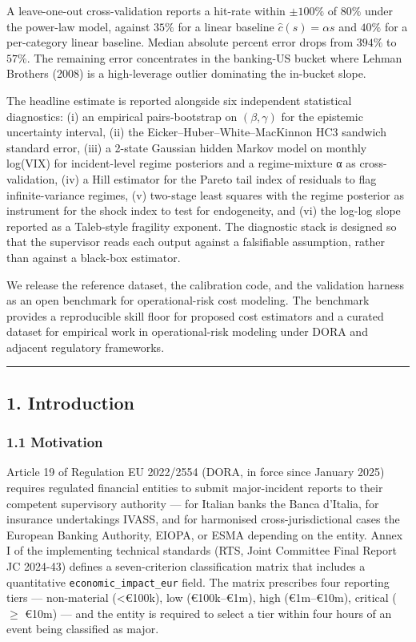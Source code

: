\documentclass[
]{article}
\begin{document}
A leave-one-out cross-validation reports a hit-rate within \(\pm 100\%\)
of \(80\%\) under the power-law model, against \(35\%\) for a linear
baseline \(\hat{c}(s) = \alpha s\) and \(40\%\) for a per-category
linear baseline. Median absolute percent error drops from \(394\%\) to
\(57\%\). The remaining error concentrates in the banking-US bucket
where Lehman Brothers (2008) is a high-leverage outlier dominating the
in-bucket slope.

The headline estimate is reported alongside six independent statistical
diagnostics: (i) an empirical pairs-bootstrap on \((\beta, \gamma)\) for
the epistemic uncertainty interval, (ii) the
Eicker--Huber--White--MacKinnon HC3 sandwich standard error, (iii) a
2-state Gaussian hidden Markov model on monthly log(VIX) for
incident-level regime posteriors and a regime-mixture α as
cross-validation, (iv) a Hill estimator for the Pareto tail index of
residuals to flag infinite-variance regimes, (v) two-stage least squares
with the regime posterior as instrument for the shock index to test for
endogeneity, and (vi) the log-log slope reported as a Taleb-style
fragility exponent. The diagnostic stack is designed so that the
supervisor reads each output against a falsifiable assumption, rather
than against a black-box estimator.

We release the reference dataset, the calibration code, and the
validation harness as an open benchmark for operational-risk cost
modeling. The benchmark provides a reproducible skill floor for proposed
cost estimators and a curated dataset for empirical work in
operational-risk modeling under DORA and adjacent regulatory frameworks.

\begin{center}\rule{0.5\linewidth}{0.5pt}\end{center}

\subsection{1. Introduction}\label{introduction}

\subsubsection{1.1 Motivation}\label{motivation}

Article 19 of Regulation EU 2022/2554 (DORA, in force since January
2025) requires regulated financial entities to submit major-incident
reports to their competent supervisory authority --- for Italian banks
the Banca d'Italia, for insurance undertakings IVASS, and for harmonised
cross-jurisdictional cases the European Banking Authority, EIOPA, or
ESMA depending on the entity. Annex I of the implementing technical
standards (RTS, Joint Committee Final Report JC 2024-43) defines a
seven-criterion classification matrix that includes a quantitative
\texttt{economic\_impact\_eur} field. The matrix prescribes four
reporting tiers --- non-material (\textless€100k), low (€100k--€1m),
high (€1m--€10m), critical (\(\geq\) €10m) --- and the entity is
required to select a tier within four hours of an event being classified
as major.
\end{document}
